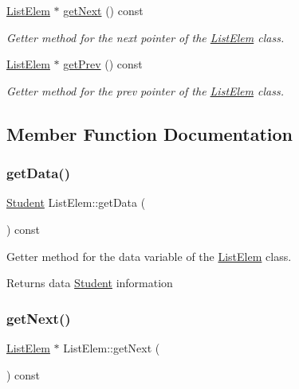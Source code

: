 \begin{DoxyCompactItemize}
\hyperlink{class_list_elem}{List\+Elem} $\ast$ \hyperlink{class_list_elem_ac615618c96d2bacc597ba59a4e8e2620}{get\+Next} () const
\begin{DoxyCompactList}\small\item\em Getter method for the \textquotesingle{}next\textquotesingle{} pointer of the \hyperlink{class_list_elem}{List\+Elem} class. \end{DoxyCompactList}\item 
\hyperlink{class_list_elem}{List\+Elem} $\ast$ \hyperlink{class_list_elem_a5e0941e76c8f85252a84d3ba3b874bc3}{get\+Prev} () const
\begin{DoxyCompactList}\small\item\em Getter method for the \textquotesingle{}prev\textquotesingle{} pointer of the \hyperlink{class_list_elem}{List\+Elem} class. \end{DoxyCompactList}\end{DoxyCompactItemize}


\subsection{Member Function Documentation}
\mbox{\label{class_list_elem_af80ce8c80d9e4dfa450d9272c965e110}} 
\subsubsection{\texorpdfstring{get\+Data()}{getData()}}
{\footnotesize\ttfamily \hyperlink{class_student}{Student} List\+Elem\+::get\+Data (\begin{DoxyParamCaption}{ }\end{DoxyParamCaption}) const}



Getter method for the \textquotesingle{}data\textquotesingle{} variable of the \hyperlink{class_list_elem}{List\+Elem} class. 

\begin{DoxyReturn}{Returns}
data \hyperlink{class_student}{Student} information 
\end{DoxyReturn}
\mbox{\label{class_list_elem_ac615618c96d2bacc597ba59a4e8e2620}} 
\subsubsection{\texorpdfstring{get\+Next()}{getNext()}}
{\footnotesize\ttfamily \hyperlink{class_list_elem}{List\+Elem} $\ast$ List\+Elem\+::get\+Next (\begin{DoxyParamCaption}{ }\end{DoxyParamCaption}) const}



